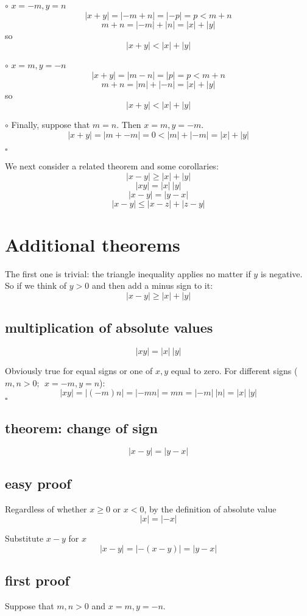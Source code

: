 \documentclass[11pt, oneside]{article}
\begin{document}
$\circ$  $x = -m, y = n$
\[ |x + y| = |-m + n| = |-p| = p < m + n \]
\[ m + n = |-m| + |n| = |x| + |y| \]
so
\[ |x + y| < |x| + |y| \]

$\circ$  $x = m, y = -n$
\[ |x + y| = |m - n| = |p| = p < m + n \]
\[ m + n = |m| + |-n| = |x| + |y| \]
so
\[ |x + y| < |x| + |y| \]

$\circ$  Finally, suppose that $m=n$.  Then $x = m, y = -m$.
\[ |x + y| = |m + -m| = 0 < |m| + |-m| = |x| + |y| \]

$\square$

We next consider a related theorem and some corollaries:
\[ |x - y| \ge |x| + |y| \]
\[ |xy| = |x| \ |y| \]
\[ |x - y| = |y - x| \]
\[ |x - y| \le |x - z| + |z - y| \]

\section*{Additional theorems}
The first one is trivial:  the triangle inequality applies no matter if $y$ is negative.  So if we think of $y > 0$ and then add a minus sign to it:
\[ |x - y| \ge |x| + |y| \]

\subsection*{multiplication of absolute values}
\[ |xy| = |x| \ |y| \]

Obviously true for equal signs or one of $x,y$ equal to zero.  For different signs ($m,n > 0; \ \ x = -m, y = n$):
\[ |xy| = |(-m)n| = |-mn| = mn = |-m| \ |n| = |x| \ |y| \]
$\square$

\subsection*{theorem:  change of sign}
\[ |x - y| = |y - x| \]

\subsection*{easy proof}

Regardless of whether $x \ge 0$ or $x < 0$, by the definition of absolute value
\[ |x| = |-x| \]

Substitute $x - y$ for $x$
\[ |x - y| = |-(x - y)| = |y - x| \]

\subsection*{first proof}
Suppose that $m,n > 0$ and $x = m, y =-n$.
\end{document}
